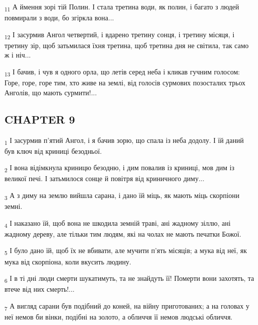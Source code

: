 \begin{tcolorbox}
\textsubscript{11} А ймення зорі тій Полин. І стала третина води, як полин, і багато з людей повмирали з води, бо згіркла вона...
\end{tcolorbox}
\begin{tcolorbox}
\textsubscript{12} І засурмив Ангол четвертий, і вдарено третину сонця, і третину місяця, і третину зір, щоб затьмилася їхня третина, щоб третина дня не світила, так само ж і ніч...
\end{tcolorbox}
\begin{tcolorbox}
\textsubscript{13} І бачив, і чув я одного орла, що летів серед неба і кликав гучним голосом: Горе, горе, горе тим, хто живе на землі, від голосів сурмових позосталих трьох Анголів, що мають сурмити!...
\end{tcolorbox}
\subsection{CHAPTER 9}
\begin{tcolorbox}
\textsubscript{1} І засурмив п'ятий Ангол, і я бачив зорю, що спала із неба додолу. І їй даний був ключ від криниці безодньої.
\end{tcolorbox}
\begin{tcolorbox}
\textsubscript{2} І вона відімкнула криницю безодню, і дим повалив із криниці, мов дим із великої печі. І затьмилося сонце й повітря від криничного диму...
\end{tcolorbox}
\begin{tcolorbox}
\textsubscript{3} А з диму на землю вийшла сарана, і дано їй міць, як мають міць скорпіони земні.
\end{tcolorbox}
\begin{tcolorbox}
\textsubscript{4} І наказано їй, щоб вона не шкодила земній траві, ані жадному зіллю, ані жадному дереву, але тільки тим людям, які на чолах не мають печатки Божої.
\end{tcolorbox}
\begin{tcolorbox}
\textsubscript{5} І було дано їй, щоб їх не вбивати, але мучити п'ять місяців; а мука від неї, як мука від скорпіона, коли вкусить людину.
\end{tcolorbox}
\begin{tcolorbox}
\textsubscript{6} І в ті дні люди смерти шукатимуть, та не знайдуть її! Померти вони захотять, та втече від них смерть!...
\end{tcolorbox}
\begin{tcolorbox}
\textsubscript{7} А вигляд сарани був подібний до коней, на війну приготованих; а на головах у неї немов би вінки, подібні на золото, а обличчя її немов людські обличчя.
\end{tcolorbox}
